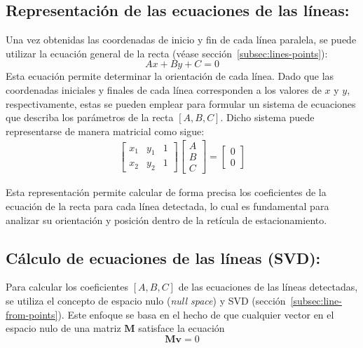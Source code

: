 \subsection{Representación de las ecuaciones de las líneas:}

Una vez obtenidas las coordenadas de inicio y fin de cada línea paralela, se puede utilizar la ecuación general de la recta (véase sección~\ref{subsec:lines-points}):
\begin{equation}
    Ax + By + C = 0
\end{equation}
Esta ecuación permite determinar la orientación de cada línea.
Dado que las coordenadas iniciales y finales de cada línea corresponden a los valores de $x$ y $y$, respectivamente,
estas se pueden emplear para formular un sistema de ecuaciones que describa los parámetros de la recta $[A, B, C]$.
Dicho sistema puede representarse de manera matricial como sigue:
\begin{equation}
    \begin{aligned}
        \left[\begin{array}{ccc}
                      x_1 & y_1 & 1 \\
                      x_2 & y_2 & 1
                  \end{array}\right]
        \begin{bmatrix}
            A \\
            B \\
            C
        \end{bmatrix}
        =
        \begin{bmatrix}
            0 \\
            0
        \end{bmatrix}
    \end{aligned}
\end{equation}

Esta representación permite calcular de forma precisa los coeficientes de la ecuación de la recta para cada línea detectada,
lo cual es fundamental para analizar su orientación y posición dentro de la retícula de estacionamiento.

\subsection{Cálculo de ecuaciones de las líneas (SVD):}

Para calcular los coeficientes $[A, B, C]$ de las ecuaciones de las líneas detectadas, se utiliza el concepto de espacio nulo (\emph{null space}) y SVD (sección~\ref{subsec:line-from-points}).
Este enfoque se basa en el hecho de que cualquier vector en el espacio nulo de una matriz $\mathbf{M}$ satisface la ecuación
\begin{equation}
    \mathbf{Mv} = 0
\end{equation}


